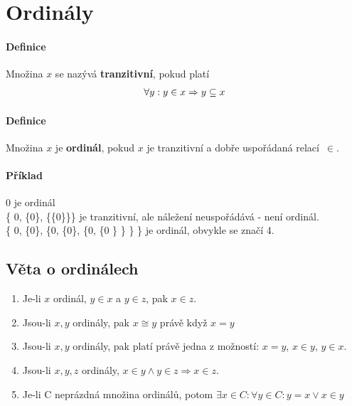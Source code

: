 \documentclass[a4paper,12pt,titlepage]{article}
\begin{document}
\section{Ordinály}
\setcounter{equation}{0}
\paragraph{Definice}
Množina $x$ se nazývá \textbf{tranzitivní}, pokud platí 
\begin{align}
	\forall y: y \in x \Rightarrow y \subseteq x
\end{align}
\paragraph{Definice}
Množina $x$ je \textbf{ordinál}, pokud $x$ je tranzitivní a dobře uspořádaná
relací~$\in$.
\paragraph{Příklad}
0  je ordinál \\
\{ 0, \{0\}, \{\{0\}\}\} je tranzitivní, ale náležení neuspořádává - není
ordinál. \\
\{ 0, \{0\}, \{0, \{0\}, \{0, \{0 \} \} \} \} je ordinál, obvykle se značí 4.

\subsection{Věta o ordinálech}
\setcounter{equation}{0}
\begin{enumerate}
	\item Je-li $x$ ordinál, $y \in x$ a $y \in z$, pak $x \in z$.
	\item Jsou-li $x, y$ ordinály, pak $x \cong y$ právě když $x = y$
	\item Jsou-li $x, y$ ordinály, pak platí právě jedna z možností: $x = y$, $x
	\in y$, $y \in x$.
	\item Jsou-li $x,y, z$ ordinály, $x \in y \land y \in z \Rightarrow x \in z$.
	\item Je-li C neprázdná množina ordinálů, potom $\exists x \in C: \forall y
	\in C: y = x \lor x \in y$
\end{enumerate}
\end{document}
